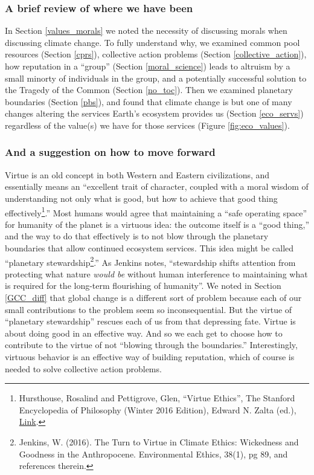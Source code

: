 \documentclass[amstex,12pt]{book}
\begin{document}
\subsubsection{A brief review of where we have been}
In Section \ref{values_morals} we noted the necessity of discussing morals when discussing climate change. To fully understand why, we examined common pool resources (Section \ref{cprs}), collective action problems (Section \ref{collective_action}), how reputation in a ``group'' (Section \ref{moral_science}) leads to altruism by a small minorty of individuals in the group, and a potentially successful solution to the Tragedy of the Common (Section \ref{no_toc}). Then we examined planetary boundaries (Section \ref{pbs}), and found that climate change is but one of many changes altering the services Earth's ecosystem provides us (Section \ref{eco_servs}) regardless of the value(s) we have for those services (Figure \ref{fig:eco_values}). 
   
\subsubsection{And a suggestion on how to move forward}
Virtue is an old concept in both Western and Eastern civilizations, and essentially means an ``excellent trait of character, coupled with a moral wisdom of understanding not only what is good, but how to achieve that good thing effectively\footnote{Hursthouse, Rosalind and Pettigrove, Glen, ``Virtue Ethics'', The Stanford Encyclopedia of Philosophy (Winter 2016 Edition), Edward N. Zalta (ed.), \href{https://plato.stanford.edu/archives/win2016/entries/ethics-virtue/}{Link}.}.'' Most humans would agree that maintaining a ``safe operating space'' for humanity of the planet is a virtuous idea: the outcome itself is a ``good thing,'' and the way to do that effectively is to not blow through the planetary boundaries that allow continued ecosystem services. This idea might be called ``planetary stewardship\footnote{Jenkins, W. (2016). The Turn to Virtue in Climate Ethics: Wickedness and Goodness in the Anthropocene. Environmental Ethics, 38(1), pg 89, and references therein.}.'' As Jenkins notes, ``stewardship shifts attention from protecting what nature \emph{would be} without human interference to maintaining what is required for the long-term flourishing of humanity''. We noted in Section \ref{GCC_diff} that global change is a different sort of problem because each of our small contributions to the problem seem so inconsequential. But the virtue of ``planetary stewardship'' rescues each of us from that depressing fate. Virtue is about doing good in an effective way. And so we each get to choose how to contribute to the virtue of not ``blowing through the boundaries.'' Interestingly, virtuous behavior is an effective way of building reputation, which of course is needed to solve collective action problems. 
\end{document}
